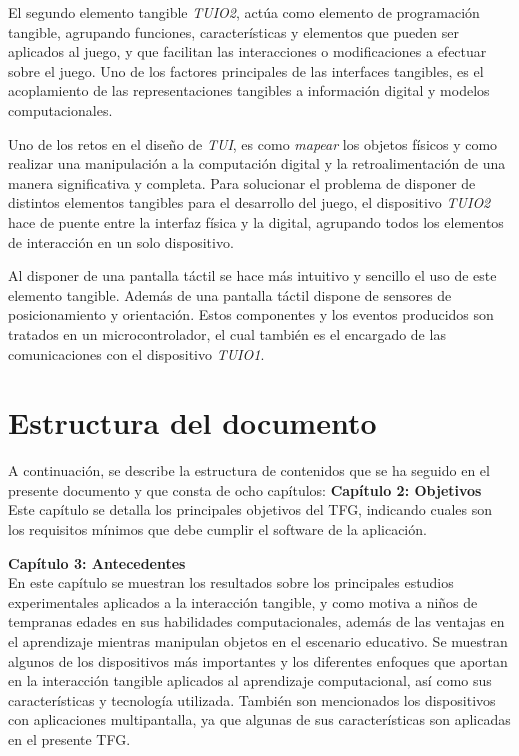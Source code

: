 El segundo elemento tangible \emph{TUIO2}, actúa como elemento de programación tangible, agrupando funciones,
características y elementos que pueden ser aplicados al juego, y que facilitan las interacciones o modificaciones a efectuar sobre el juego. Uno de los factores principales de las interfaces tangibles, es el acoplamiento de las representaciones tangibles a información digital y modelos computacionales. 

Uno de los retos en el diseño de \emph{TUI}, es como \emph{mapear} los objetos físicos y como realizar una manipulación a la computación digital y la retroalimentación de una manera significativa y completa.
Para solucionar el problema de disponer de distintos elementos tangibles para el desarrollo del juego, el dispositivo \emph{TUIO2} hace de puente entre la interfaz física y la digital, agrupando todos los elementos de interacción en un solo dispositivo. 

Al disponer de una pantalla táctil se hace más intuitivo y sencillo el uso de este elemento tangible. Además de una pantalla táctil dispone de sensores de posicionamiento y orientación. Estos componentes y los eventos producidos son tratados en un microcontrolador, el cual también es el encargado de las comunicaciones con el dispositivo \emph{TUIO1}.


\section{Estructura del documento}

A continuación, se describe la estructura de contenidos que se ha seguido en el presente documento y que consta de ocho capítulos:
\textbf{Capítulo 2: Objetivos}\\
Este capítulo se detalla los principales objetivos del TFG, indicando cuales son los requisitos mínimos que debe cumplir el software de la aplicación. 

\textbf{Capítulo 3: Antecedentes}\\
En este capítulo se muestran los resultados sobre los principales estudios experimentales aplicados a la interacción tangible, y como motiva a niños de tempranas edades en sus habilidades computacionales, además de las ventajas en el aprendizaje mientras manipulan objetos en el escenario educativo.
Se muestran algunos de los dispositivos más importantes y los diferentes enfoques que aportan en la interacción tangible aplicados al aprendizaje computacional, así como sus características y tecnología utilizada.
También son mencionados los dispositivos con aplicaciones multipantalla, ya que algunas de sus características son aplicadas en el presente TFG.

